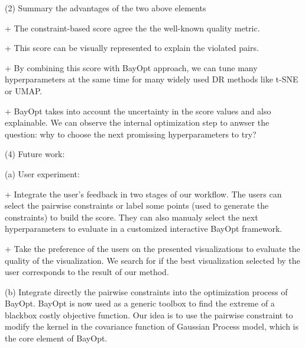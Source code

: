 \vspace{8pt}
\par (2) Summary the advantages of the two above elements

+ The constraint-based score agree the the well-known quality metric.

+ This score can be visually represented to explain the violated pairs.

+ By combining this score with BayOpt approach, we can tune many hyperparameters at the same time for many widely used DR methods like t-SNE or UMAP.

+ BayOpt takes into account the uncertainty in the score values and also explainable. We can observe the internal optimization step to anwser the question: why to choose the next promissing hyperparameters to try?


\vspace{8pt}
\par (4) Future work:

(a) User experiment:

+ Integrate the user's feedback in two stages of our workflow.
The users can select the pairwise constraints or label some points (used to generate the constraints) to build the score.
They can also manualy select the next hyperparameters to evaluate in a customized interactive BayOpt framework.

+ Take the preference of the users on the presented visualizations to evaluate the quality of the visualization. We search for if the best visualization selected by the user corresponds to the result of our method.


(b) Integrate directly the pairwise constraints into the optimization process of BayOpt.
BayOpt is now used as a generic toolbox to find the extreme of a blackbox costly objective function.
Our idea is to use the pairwise constraint to modify the kernel in the covariance function of Gaussian Process model, which is the core element of BayOpt.
